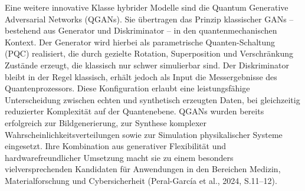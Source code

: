 Eine weitere innovative Klasse hybrider Modelle sind die Quantum Generative Adversarial Networks (QGANs). Sie übertragen das Prinzip klassischer GANs – bestehend aus Generator und Diskriminator – in den quantenmechanischen Kontext. Der Generator wird hierbei als parametrische Quanten-Schaltung (PQC) realisiert, die durch gezielte Rotation, Superposition und Verschränkung Zustände erzeugt, die klassisch nur schwer simulierbar sind.
Der Diskriminator bleibt in der Regel klassisch, erhält jedoch als Input die Messergebnisse des Quantenprozessors. Diese Konfiguration erlaubt eine leistungsfähige Unterscheidung zwischen echten und synthetisch erzeugten Daten, bei gleichzeitig reduzierter Komplexität auf der Quantenebene.
QGANs wurden bereits erfolgreich zur Bildgenerierung, zur Synthese komplexer Wahrscheinlichkeitsverteilungen sowie zur Simulation physikalischer Systeme eingesetzt. Ihre Kombination aus generativer Flexibilität und hardwarefreundlicher Umsetzung macht sie zu einem besonders vielversprechenden Kandidaten für Anwendungen in den Bereichen Medizin, Materialforschung und Cybersicherheit (Peral-García et al., 2024, S.11–12).

